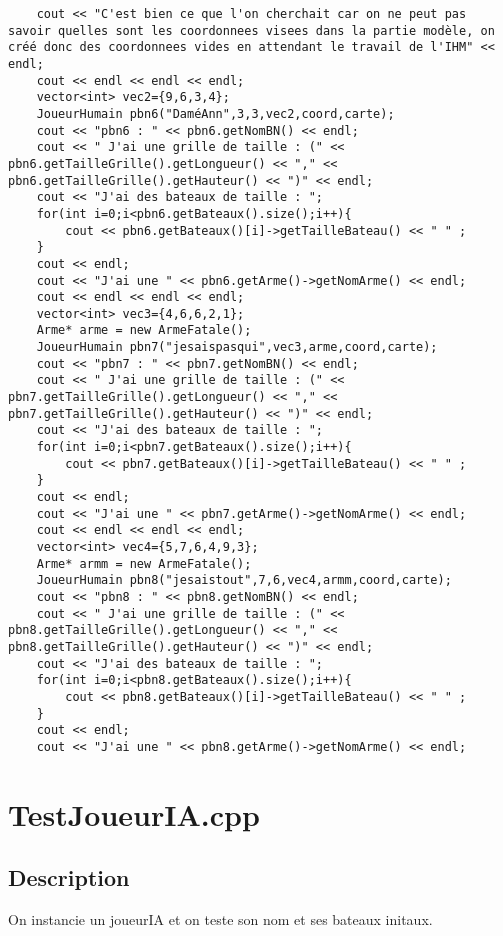 \begin{lstlisting}
	cout << "C'est bien ce que l'on cherchait car on ne peut pas savoir quelles sont les coordonnees visees dans la partie modèle, on créé donc des coordonnees vides en attendant le travail de l'IHM" << endl;
	cout << endl << endl << endl;
	vector<int> vec2={9,6,3,4};
	JoueurHumain pbn6("DaméAnn",3,3,vec2,coord,carte);
	cout << "pbn6 : " << pbn6.getNomBN() << endl;
	cout << " J'ai une grille de taille : (" << pbn6.getTailleGrille().getLongueur() << "," << pbn6.getTailleGrille().getHauteur() << ")" << endl;
	cout << "J'ai des bateaux de taille : ";
	for(int i=0;i<pbn6.getBateaux().size();i++){
		cout << pbn6.getBateaux()[i]->getTailleBateau() << " " ;
	}
	cout << endl;
	cout << "J'ai une " << pbn6.getArme()->getNomArme() << endl;
	cout << endl << endl << endl;
	vector<int> vec3={4,6,6,2,1};
	Arme* arme = new ArmeFatale();
	JoueurHumain pbn7("jesaispasqui",vec3,arme,coord,carte);
	cout << "pbn7 : " << pbn7.getNomBN() << endl;
	cout << " J'ai une grille de taille : (" << pbn7.getTailleGrille().getLongueur() << "," << pbn7.getTailleGrille().getHauteur() << ")" << endl;
	cout << "J'ai des bateaux de taille : ";
	for(int i=0;i<pbn7.getBateaux().size();i++){
		cout << pbn7.getBateaux()[i]->getTailleBateau() << " " ;
	}
	cout << endl;
	cout << "J'ai une " << pbn7.getArme()->getNomArme() << endl;
	cout << endl << endl << endl;
	vector<int> vec4={5,7,6,4,9,3};
	Arme* armm = new ArmeFatale();
	JoueurHumain pbn8("jesaistout",7,6,vec4,armm,coord,carte);
	cout << "pbn8 : " << pbn8.getNomBN() << endl;	
	cout << " J'ai une grille de taille : (" << pbn8.getTailleGrille().getLongueur() << "," << pbn8.getTailleGrille().getHauteur() << ")" << endl;
	cout << "J'ai des bateaux de taille : ";
	for(int i=0;i<pbn8.getBateaux().size();i++){
		cout << pbn8.getBateaux()[i]->getTailleBateau() << " " ;
	}
	cout << endl;
	cout << "J'ai une " << pbn8.getArme()->getNomArme() << endl;
	\end{lstlisting}
    \section{TestJoueurIA.cpp}
        \subsection{Description}
        On instancie un joueurIA et on teste son nom et ses bateaux initaux.
